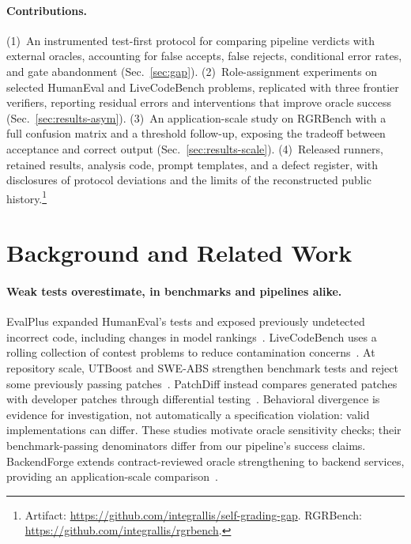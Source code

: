 \documentclass{article}
\begin{document}
\paragraph{Contributions.}
(1)~An instrumented test-first protocol for comparing pipeline verdicts with external
oracles, accounting for false accepts, false rejects, conditional error rates, and gate abandonment
(Sec.~\ref{sec:gap}).
(2)~Role-assignment experiments on selected HumanEval and LiveCodeBench problems, replicated
with three frontier verifiers, reporting residual errors and interventions that improve
oracle success (Sec.~\ref{sec:results-asym}).
(3)~An application-scale study on RGRBench with a full confusion matrix and a threshold
follow-up, exposing the tradeoff between acceptance and correct output
(Sec.~\ref{sec:results-scale}).
(4)~Released runners, retained results, analysis code, prompt templates, and a defect register,
with disclosures of protocol deviations and the limits of the reconstructed public
history.\footnote{Artifact: \url{https://github.com/integrallis/self-grading-gap}.
RGRBench: \url{https://github.com/integrallis/rgrbench}.}

\section{Background and Related Work}
\label{sec:related}

\paragraph{Weak tests overestimate, in benchmarks and pipelines alike.}
EvalPlus expanded HumanEval's tests and exposed previously undetected incorrect code,
including changes in model rankings~\cite{liu2023evalplus}. LiveCodeBench uses a rolling
collection of contest problems to reduce contamination concerns~\cite{jain2024livecodebench}.
At repository scale, UTBoost and SWE-ABS strengthen benchmark tests and reject some
previously passing patches~\cite{yu2025utboost,yu2026sweabs}. PatchDiff instead compares
generated patches with developer patches through differential testing~\cite{wang2025patchdiff}.
Behavioral divergence is evidence for investigation, not automatically a specification
violation: valid implementations can differ. These studies motivate oracle sensitivity
checks; their benchmark-passing denominators differ from our pipeline's success claims.
BackendForge extends contract-reviewed oracle strengthening to backend services,
providing an application-scale comparison~\cite{guo2026backendforge}.
\end{document}
